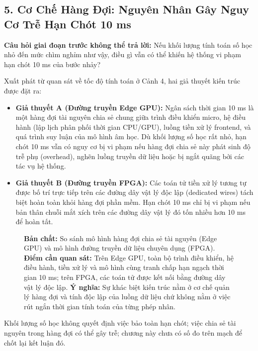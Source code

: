 \documentclass[11pt,a4paper]{article}
\begin{document}
\subsection*{5. Cơ Chế Hàng Đợi: Nguyên Nhân Gây Nguy Cơ Trễ Hạn Chót 10 ms}

\textbf{Câu hỏi giai đoạn trước không thể trả lời:} Nếu khối lượng tính toán số học nhỏ đến mức chìm nghỉm như vậy, điều gì vẫn có thể khiến hệ thống vi phạm hạn chót 10 ms của bước nhảy?

Xuất phát từ quan sát về tốc độ tính toán ở Cảnh 4, hai giả thuyết kiến trúc được đặt ra:
\begin{itemize}
    \item \textbf{Giả thuyết A (Đường truyền Edge GPU):} Ngân sách thời gian 10 ms là một hàng đợi tài nguyên chia sẻ chung giữa trình điều khiển micro, hệ điều hành (lập lịch phân phối thời gian CPU/GPU), luồng tiền xử lý frontend, và quá trình suy luận của mô hình âm học. Dù khối lượng số học rất nhỏ, hạn chót 10 ms vẫn có nguy cơ bị vi phạm nếu hàng đợi chia sẻ này phát sinh độ trễ phụ (overhead), nghẽn luồng truyền dữ liệu hoặc bị ngắt quãng bởi các tác vụ hệ thống.
    \item \textbf{Giả thuyết B (Đường truyền FPGA):} Các toán tử tiền xử lý tương tự được bố trí trực tiếp trên các đường dây vật lý độc lập (dedicated wires) tách biệt hoàn toàn khỏi hàng đợi phần mềm. Hạn chót 10 ms chỉ bị vi phạm nếu bản thân chuỗi mắt xích trên các đường dây vật lý đó tốn nhiều hơn 10 ms để hoàn tất.
\end{itemize}

\begin{figure}[h]
\centering

\caption{\textbf{Bản chất:} So sánh mô hình hàng đợi chia sẻ tài nguyên (Edge GPU) và mô hình đường truyền dữ liệu chuyên dụng (FPGA). \textbf{Điểm cần quan sát:} Trên Edge GPU, toàn bộ trình điều khiển, hệ điều hành, tiền xử lý và mô hình cùng tranh chấp hạn ngạch thời gian 10 ms; trên FPGA, các toán tử được kết nối bằng đường dây vật lý độc lập. \textbf{Ý nghĩa:} Sự khác biệt kiến trúc nằm ở cơ chế quản lý hàng đợi và tính độc lập của luồng dữ liệu chứ không nằm ở việc rút ngắn thời gian tính toán của từng phép nhân.}
\label{fig:1_4b_queues}
\end{figure}

\begin{physicalinsight}
Khối lượng số học không quyết định việc bảo toàn hạn chót; việc chia sẻ tài nguyên trong hàng đợi có thể gây trễ; chương này chưa có số đo trên mạch để chốt lại kết luận đó.
\end{physicalinsight}
\end{document}
